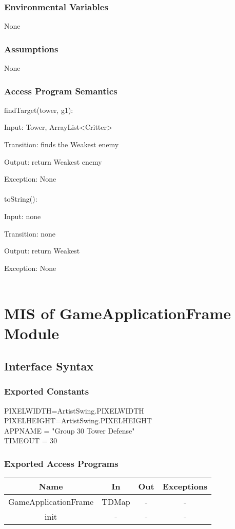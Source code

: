 \documentclass[12,english]{article}
\begin{document}
		\subsubsection{Environmental Variables}
		None
		\subsubsection{Assumptions}
        None

		\subsubsection{Access Program Semantics}
		findTarget(tower, g1):
		
		Input: Tower, ArrayList<Critter>
		
		Transition: finds the Weakest enemy
		
		Output: return Weakest enemy
		
		Exception: None\\
		\\
		toString():
		
		Input: none
		
		Transition: none
		
		Output: return Weakest
		
		Exception: None\\
		\\
		
\section{MIS of GameApplicationFrame Module}
	\subsection{Interface Syntax}
	\subsubsection{Exported Constants}
	    PIXELWIDTH=ArtistSwing.PIXELWIDTH\\
	    PIXELHEIGHT=ArtistSwing.PIXELHEIGHT\\
	    APPNAME = "Group 30 Tower Defense"\\
	    TIMEOUT = 30\\
		\subsubsection{Exported Access Programs}
		
	\begin{tabular}[pos]{|c|c|c|c|}
	\hline
	\textbf{Name}& \textbf{In} & \textbf{Out} & \textbf{Exceptions} \\ 
	\hline
	GameApplicationFrame & TDMap & - & - \\ \hline
	init & - & - & - \\ \hline
	
					
	\end{tabular}		
		
\end{document}
